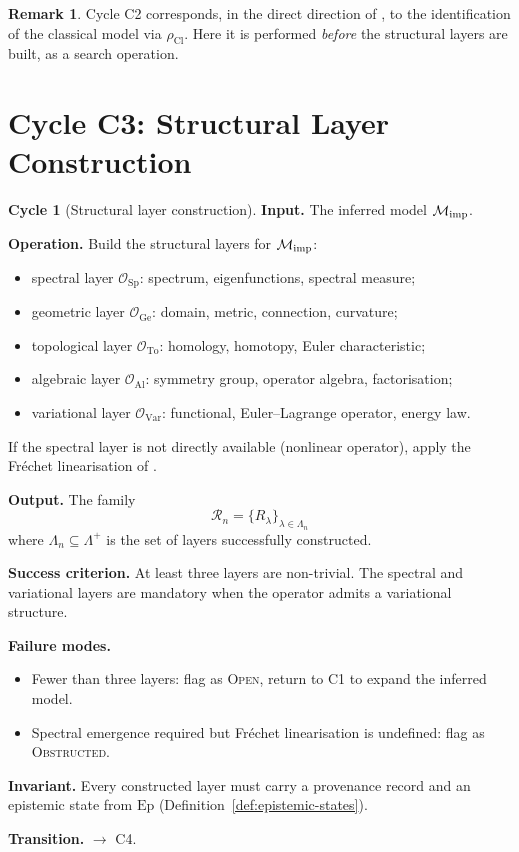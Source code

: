 \documentclass[11pt,a4paper]{article}
\theoremstyle{definition}
\newtheorem{cycle}{Cycle}[section]
\newtheorem{remark}[definition]{Remark}
\theoremstyle{plain}
\newcommand{\Lam}{\Lambda}
\newcommand{\Sp}{\mathrm{Sp}}
\newcommand{\Ge}{\mathrm{Ge}}
\newcommand{\To}{\mathrm{To}}
\newcommand{\Al}{\mathrm{Al}}
\newcommand{\Cl}{\mathrm{Cl}}
\newcommand{\Var}{\mathrm{Var}}
\newcommand{\Rcal}{\mathcal{R}}
\newcommand{\Mcal}{\mathcal{M}}
\newcommand{\Ocal}{\mathcal{O}}
\newcommand{\STOPEN}{\textsc{Open}}
\newcommand{\STOBSTR}{\textsc{Obstructed}}
\begin{document}
\begin{remark}
Cycle C2 corresponds, in the direct direction of \cite{framework},
to the identification of the classical model via $\rho_\Cl$. Here
it is performed \emph{before} the structural layers are built, as a
search operation.
\end{remark}

\section{Cycle C3: Structural Layer Construction}
\label{sec:c3}

\begin{cycle}[Structural layer construction]\label{cy:c3}
\textbf{Input.} The inferred model $\Mcal_{\rm imp}$.

\medskip
\textbf{Operation.} Build the structural layers for
$\Mcal_{\rm imp}$:
\begin{itemize}
  \item spectral layer $\Ocal_\Sp$: spectrum, eigenfunctions,
        spectral measure;
  \item geometric layer $\Ocal_\Ge$: domain, metric, connection,
        curvature;
  \item topological layer $\Ocal_\To$: homology, homotopy, Euler
        characteristic;
  \item algebraic layer $\Ocal_\Al$: symmetry group, operator
        algebra, factorisation;
  \item variational layer $\Ocal_\Var$: functional, Euler--Lagrange
        operator, energy law.
\end{itemize}
If the spectral layer is not directly available (nonlinear operator),
apply the Fr\'echet linearisation of \cite[Construction 3.6]{paperI}.

\medskip
\textbf{Output.} The family
\[
  \Rcal_n = \{R_\lambda\}_{\lambda \in \Lam_n}
\]
where $\Lam_n \subseteq \Lam^+$ is the set of layers successfully
constructed.

\medskip
\textbf{Success criterion.} At least three layers are non-trivial.
The spectral and variational layers are mandatory when the operator
admits a variational structure.

\medskip
\textbf{Failure modes.}
\begin{itemize}
  \item Fewer than three layers: flag as \STOPEN, return to C1 to
        expand the inferred model.
  \item Spectral emergence required but Fr\'echet linearisation is
        undefined: flag as \STOBSTR.
\end{itemize}

\medskip
\textbf{Invariant.} Every constructed layer must carry a provenance
record and an epistemic state from $\mathrm{Ep}$
(Definition~\ref{def:epistemic-states}).

\medskip
\textbf{Transition.} $\to$ C4.
\end{cycle}
\end{document}
